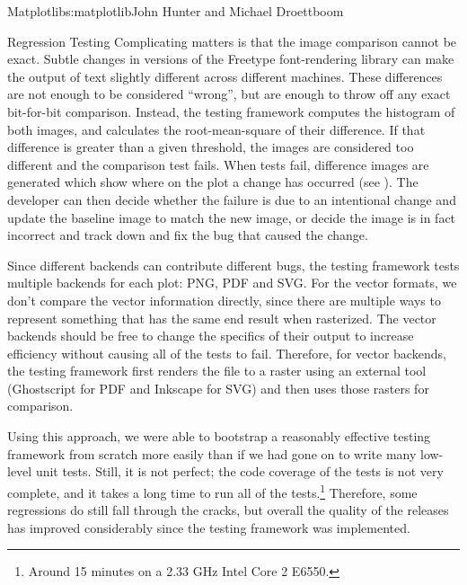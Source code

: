 \begin{aosachapter}{Matplotlib}{s:matplotlib}{John Hunter and Michael Droettboom}
\begin{aosasect1}{Regression Testing}
Complicating matters is that the image comparison cannot be exact.
Subtle changes in versions of the Freetype font-rendering library can
make the output of text slightly different across different machines.
These differences are not enough to be considered ``wrong'', but are
enough to throw off any exact bit-for-bit comparison.  Instead, the
testing framework computes the histogram of both images, and
calculates the root-mean-square of their difference.  If that
difference is greater than a given threshold, the images are
considered too different and the comparison test fails.  When tests
fail, difference images are generated which show where on the plot a
change has occurred (see ).  The
developer can then decide whether the failure is due to an intentional
change and update the baseline image to match the new image, or
decide the image is in fact incorrect and track down and fix the bug
that caused the change.


Since different backends can contribute different bugs, the testing
framework tests multiple backends for each plot: PNG, PDF and SVG.
For the vector formats, we don't compare the vector information
directly, since there are multiple ways to represent something that
has the same end result when rasterized.  The vector backends should
be free to change the specifics of their output to increase efficiency
without causing all of the tests to fail.  Therefore, for vector
backends, the testing framework first renders the file to a raster
using an external tool (Ghostscript for PDF and Inkscape for SVG) and
then uses those rasters for comparison.

Using this approach, we were able to bootstrap a reasonably effective
testing framework from scratch more easily than if we had gone on to
write many low-level unit tests.  Still, it is not perfect;  the code
coverage of the tests is not very complete, and it takes a long time to
run all of the tests.\footnote{Around 15 minutes on a 2.33 GHz Intel
  Core 2 E6550.}  Therefore, some regressions do still fall through
the cracks, but overall the quality of the releases has improved
considerably since the testing framework was implemented.

\end{aosasect1}


\end{aosachapter}
